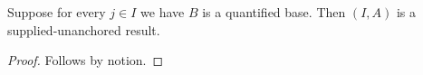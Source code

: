 

\begin{theorem}\label{supplied_negative_wrong_capture}
    Suppose for every $j\in I$ we have $B$ is a quantified base.
    Then $(I,A)$ is a supplied-unanchored result.
\end{theorem}
\begin{proof}
    Follows by notion.
\end{proof}
